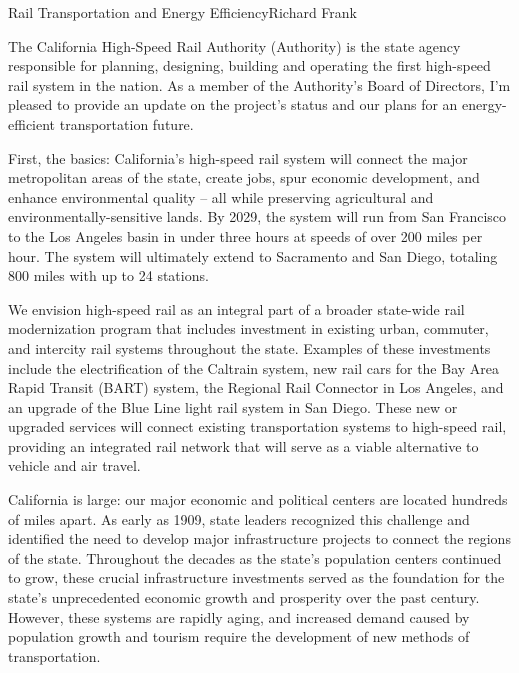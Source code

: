 \documentclass[10pt]{papertex}
\begin{document}
\makeatletter
\renewcommand{\papertex@headDateTime}{
    \raisebox{-5pt}
    {\fontsize{5mm}{6mm}\usefont{T1}{bch}{b}{n}{April 2014}}
    }
\makeatother

\begin{news}{2}{Rail Transportation and Energy Efficiency}{Richard Frank}{}{}

The California High-Speed Rail Authority (Authority) is the state agency 
responsible for planning, designing, building and operating the first 
high-speed rail system in the nation. As a member of the Authority’s Board of 
Directors, I’m pleased to provide an update on the project’s status and our 
plans for an energy-efficient transportation future.

First, the basics: California’s high-speed rail system will connect the major 
metropolitan areas of the state, create jobs, spur economic development, and 
enhance environmental quality – all while preserving agricultural and 
environmentally-sensitive lands. By 2029, the system will run from San 
Francisco to the Los Angeles basin in under three hours at speeds of over 
200 miles per hour. The system will ultimately extend to Sacramento and San 
Diego, totaling 800 miles with up to 24 stations.

We envision high-speed rail as an integral part of a broader state-wide rail 
modernization program that includes investment in existing urban, commuter, 
and intercity rail systems throughout the state.  Examples of these 
investments include the electrification of the Caltrain system, new rail cars 
for the Bay Area Rapid Transit (BART) system, the Regional Rail Connector in 
Los Angeles, and an upgrade of the Blue Line light rail system in San Diego. 
These new or upgraded services will connect existing transportation systems to 
high-speed rail, providing an integrated rail network that will serve as a 
viable alternative to vehicle and air travel.

California is large: our major economic and political centers are located 
hundreds of miles apart. As early as 1909, state leaders recognized this 
challenge and identified the need to develop major infrastructure projects to 
connect the regions of the state. Throughout the decades as the state’s 
population centers continued to grow, these crucial infrastructure investments 
served as the foundation for the state’s unprecedented economic growth and 
prosperity over the past century. However, these systems are rapidly aging, 
and increased demand caused by population growth and tourism require the 
development of new methods of transportation.


\end{news}
\end{document}
